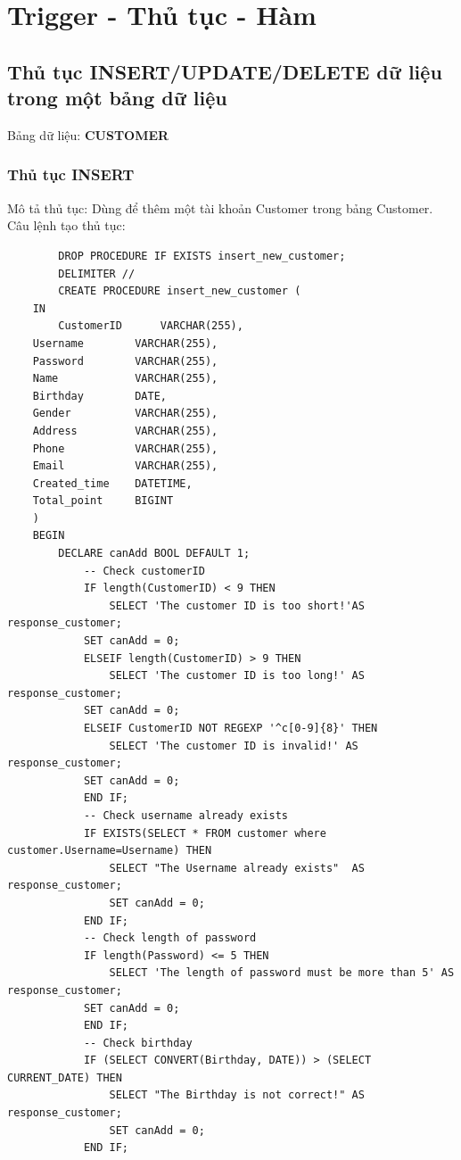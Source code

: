 \section{Trigger - Thủ tục - Hàm}
\subsection{Thủ tục INSERT/UPDATE/DELETE dữ liệu trong một bảng dữ liệu}
Bảng dữ liệu: \textbf{CUSTOMER}
    \subsubsection{Thủ tục INSERT}
    Mô tả thủ tục: Dùng để thêm một tài khoản Customer trong bảng Customer. \\
    Câu lệnh tạo thủ tục:
    \begin{verbatim}
        DROP PROCEDURE IF EXISTS insert_new_customer;
        DELIMITER //
        CREATE PROCEDURE insert_new_customer (
	IN
        CustomerID      VARCHAR(255),
	Username        VARCHAR(255),
	Password        VARCHAR(255),
	Name            VARCHAR(255),
	Birthday        DATE,
	Gender          VARCHAR(255),
	Address         VARCHAR(255),
	Phone           VARCHAR(255),
	Email           VARCHAR(255),
	Created_time    DATETIME,
	Total_point     BIGINT
	)
	BEGIN
    	DECLARE canAdd BOOL DEFAULT 1;
            -- Check customerID 
            IF length(CustomerID) < 9 THEN
                SELECT 'The customer ID is too short!'AS response_customer;
            SET canAdd = 0;
            ELSEIF length(CustomerID) > 9 THEN
                SELECT 'The customer ID is too long!' AS response_customer;
            SET canAdd = 0;
            ELSEIF CustomerID NOT REGEXP '^c[0-9]{8}' THEN
                SELECT 'The customer ID is invalid!' AS response_customer;
            SET canAdd = 0;
            END IF;
            -- Check username already exists
            IF EXISTS(SELECT * FROM customer where customer.Username=Username) THEN
                SELECT "The Username already exists"  AS response_customer;
                SET canAdd = 0;
            END IF;
            -- Check length of password
            IF length(Password) <= 5 THEN
                SELECT 'The length of password must be more than 5' AS response_customer;
            SET canAdd = 0;
            END IF;
            -- Check birthday
            IF (SELECT CONVERT(Birthday, DATE)) > (SELECT CURRENT_DATE) THEN
                SELECT "The Birthday is not correct!" AS response_customer;
                SET canAdd = 0;
            END IF;


\end{verbatim}
